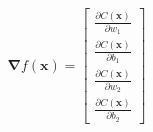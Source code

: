 \documentclass[preview]{standalone}
\begin{document}
\begin{align*}
\mathbf{\nabla} f(\mathbf{x}) =\begin{bmatrix} \frac{\partial C(\mathbf{x})}{\partial w_1} \\ \frac{\partial C(\mathbf{x})}{\partial b_1} \\            \frac{\partial C(\mathbf{x})}{\partial w_2} \\           \frac{\partial C(\mathbf{x})}{\partial b_2}\end{bmatrix}
\end{align*}
\end{document}
